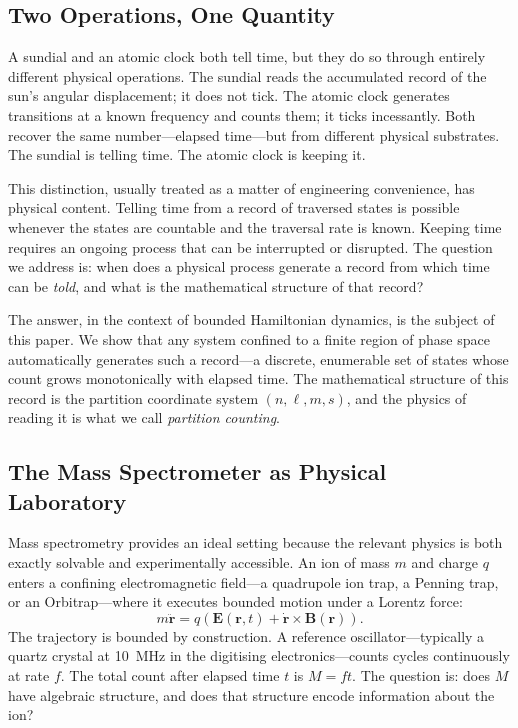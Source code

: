 \documentclass[twocolumn,10pt]{article}
\begin{document}
\subsection{Two Operations, One Quantity}

A sundial and an atomic clock both tell time, but they do so through entirely different physical operations. The sundial reads the accumulated record of the sun's angular displacement; it does not tick. The atomic clock generates transitions at a known frequency and counts them; it ticks incessantly. Both recover the same number---elapsed time---but from different physical substrates. The sundial is telling time. The atomic clock is keeping it.

This distinction, usually treated as a matter of engineering convenience, has physical content. Telling time from a record of traversed states is possible whenever the states are countable and the traversal rate is known. Keeping time requires an ongoing process that can be interrupted or disrupted. The question we address is: when does a physical process generate a record from which time can be \emph{told}, and what is the mathematical structure of that record?

The answer, in the context of bounded Hamiltonian dynamics, is the subject of this paper. We show that any system confined to a finite region of phase space automatically generates such a record---a discrete, enumerable set of states whose count grows monotonically with elapsed time. The mathematical structure of this record is the partition coordinate system $(n, \ell, m, s)$, and the physics of reading it is what we call \emph{partition counting}.

\subsection{The Mass Spectrometer as Physical Laboratory}

Mass spectrometry provides an ideal setting because the relevant physics is both exactly solvable and experimentally accessible. An ion of mass $m$ and charge $q$ enters a confining electromagnetic field---a quadrupole ion trap, a Penning trap, or an Orbitrap---where it executes bounded motion under a Lorentz force:
\begin{equation}
    m\ddot{\mathbf{r}} = q\left(\mathbf{E}(\mathbf{r}, t) + \dot{\mathbf{r}} \times \mathbf{B}(\mathbf{r})\right).
\end{equation}
The trajectory is bounded by construction. A reference oscillator---typically a quartz crystal at 10~MHz in the digitising electronics---counts cycles continuously at rate $f$. The total count after elapsed time $t$ is $M = ft$. The question is: does $M$ have algebraic structure, and does that structure encode information about the ion?
\end{document}

